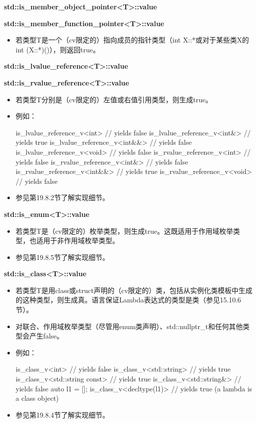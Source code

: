 \textbf{std::is\_member\_object\_pointer<T>::value}

\textbf{std::is\_member\_function\_pointer<T>::value}

\begin{itemize}
\item 
若类型T是一个（cv限定的）指向成员的指针类型（int X::*或对于某些类X的int (X::*)()），则返回true。
\end{itemize}

\textbf{std::is\_lvalue\_reference<T>::value}

\textbf{std::is\_rvalue\_reference<T>::value}

\begin{itemize}
\item 
若类型T分别是（cv限定的）左值或右值引用类型，则生成true。

\item 
例如：
\begin{cpp}
is_lvalue_reference_v<int> // yields false
is_lvalue_reference_v<int&> // yields true
is_lvalue_reference_v<int&&> // yields false
is_lvalue_reference_v<void> // yields false
is_rvalue_reference_v<int> // yields false
is_rvalue_reference_v<int&> // yields false
is_rvalue_reference_v<int&&> // yields true
is_rvalue_reference_v<void> // yields false
\end{cpp}

\item 
参见第19.8.2节了解实现细节。
\end{itemize}

\textbf{std::is\_enum<T>::value}

\begin{itemize}
\item 
若类型T是（cv限定的）枚举类型，则生成true。这既适用于作用域枚举类型，也适用于非作用域枚举类型。

\item 
参见第19.8.5节了解实现细节。
\end{itemize}

\textbf{std::is\_class<T>::value}

\begin{itemize}
\item 
若类型T是用class或struct声明的（cv限定的）类，包括从实例化类模板中生成的这种类型，则生成真。语言保证Lambda表达式的类型是类（参见15.10.6节）。

\item 
对联合、作用域枚举类型（尽管用enum类声明）、std::nullptr\_t和任何其他类型会产生false。

\item 
例如：
\begin{cpp}
is_class_v<int> // yields false
is_class_v<std::string> // yields true
is_class_v<std::string const> // yields true
is_class_v<std::string&> // yields false
auto l1 = []{};
is_class_v<decltype(l1)> // yields true (a lambda is a class object)
\end{cpp}

\item 
参见第19.8.4节了解实现细节。
\end{itemize}


